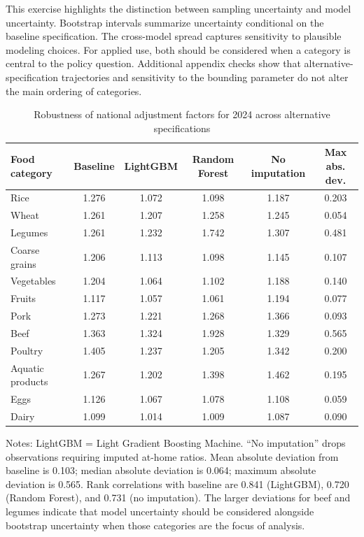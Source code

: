 \documentclass[preprint,12pt,authoryear]{elsarticle}
\begin{document}
This exercise highlights the distinction between sampling uncertainty and model uncertainty. Bootstrap intervals summarize uncertainty conditional on the baseline specification. The cross-model spread captures sensitivity to plausible modeling choices. For applied use, both should be considered when a category is central to the policy question. Additional appendix checks show that alternative-specification trajectories and sensitivity to the bounding parameter do not alter the main ordering of categories.

\begin{table}[htbp]
\centering
\small
\begin{threeparttable}
\caption{Robustness of national adjustment factors for 2024 across alternative specifications}
\label{tab:robustness}
\setlength{\tabcolsep}{0pt} 
\begin{tabular*}{\textwidth}{@{\extracolsep{\fill}} l ccccc @{}}
\toprule
Food category & Baseline & LightGBM & Random Forest & No imputation & Max abs. dev. \\
\midrule
Rice             & 1.276 & 1.072 & 1.098 & 1.187 & 0.203 \\
Wheat            & 1.261 & 1.207 & 1.258 & 1.245 & 0.054 \\
Legumes          & 1.261 & 1.232 & 1.742 & 1.307 & 0.481 \\
Coarse grains    & 1.206 & 1.113 & 1.098 & 1.145 & 0.107 \\
Vegetables       & 1.204 & 1.064 & 1.102 & 1.188 & 0.140 \\
Fruits           & 1.117 & 1.057 & 1.061 & 1.194 & 0.077 \\
Pork             & 1.273 & 1.221 & 1.268 & 1.366 & 0.093 \\
Beef             & 1.363 & 1.324 & 1.928 & 1.329 & 0.565 \\
Poultry          & 1.405 & 1.237 & 1.205 & 1.342 & 0.200 \\
Aquatic products & 1.267 & 1.202 & 1.398 & 1.462 & 0.195 \\
Eggs             & 1.126 & 1.067 & 1.078 & 1.108 & 0.059 \\
Dairy            & 1.099 & 1.014 & 1.009 & 1.087 & 0.090 \\
\bottomrule
\end{tabular*}
\begin{tablenotes}[flushleft]
\scriptsize
\item Notes: LightGBM = Light Gradient Boosting Machine. ``No imputation'' drops observations requiring imputed at-home ratios. Mean absolute deviation from baseline is 0.103; median absolute deviation is 0.064; maximum absolute deviation is 0.565. Rank correlations with baseline are 0.841 (LightGBM), 0.720 (Random Forest), and 0.731 (no imputation). The larger deviations for beef and legumes indicate that model uncertainty should be considered alongside bootstrap uncertainty when those categories are the focus of analysis.
\end{tablenotes}
\end{threeparttable}
\end{table}
\end{document}
